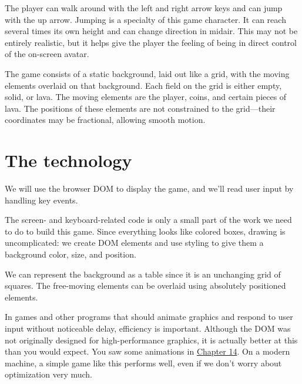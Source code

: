 The player can walk around with the left and right arrow keys and can jump with the up arrow. Jumping is a specialty of this game character. It can reach several times its own height and can change direction in midair. This may not be entirely realistic, but it helps give the player the feeling of being in direct control of the on-screen avatar.

The game consists of a static background, laid out like a grid, with the moving elements overlaid on that background. Each field on the grid is either empty, solid, or lava. The moving elements are the player, coins, and certain pieces of lava. The positions of these elements are not constrained to the grid—their coordinates may be fractional, allowing smooth motion.

\section{The technology}

We will use the browser DOM to display the game, and we'll read user input by handling key events.

The screen- and keyboard-related code is only a small part of the work we need to do to build this game. Since everything looks like colored boxes, drawing is uncomplicated: we create DOM elements and use styling to give them a background color, size, and position.

We can represent the background as a table since it is an unchanging grid of squares. The free-moving elements can be overlaid using absolutely positioned elements.

In games and other programs that should animate graphics and respond to user input without noticeable delay, efficiency is important. Although the DOM was not originally designed for high-performance graphics, it is actually better at this than you would expect. You saw some animations in \hyperref[dom.animation]{Chapter 14}. On a modern machine, a simple game like this performs well, even if we don't worry about optimization very much.

